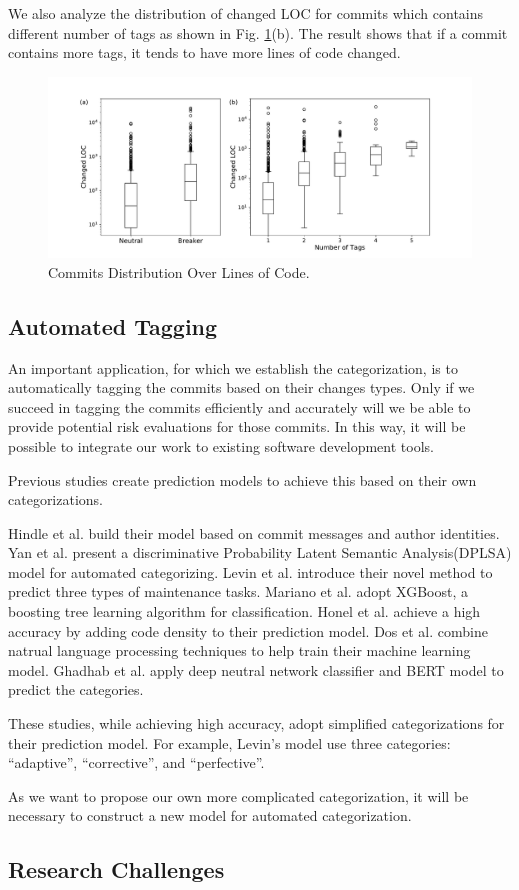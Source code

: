 We also analyze the distribution of changed LOC for commits which contains different number of tags as shown in Fig. \ref{fig: commit_LOC}(b).
The result shows that if a commit contains more tags, it tends to have more lines of code changed. 
\begin{figure}[htbp]
\centerline{\includegraphics[scale=0.5]{figures/commit_size.pdf}}
\caption{Commits Distribution Over Lines of Code.}
\label{fig: commit_LOC}
\end{figure}

\subsection{Automated Tagging}
An important application, for which we establish the categorization, is to automatically tagging the commits based on their changes types.
Only if we succeed in tagging the commits efficiently and accurately will we be able to provide potential risk evaluations for those commits. 
In this way, it will be possible to integrate our work to existing software development tools.

Previous studies create prediction models to achieve this based on their own categorizations.

Hindle et al. \cite{Hindle_auto} build their model based on commit messages and author identities.
Yan et al. \cite{yan2016automatically} present a discriminative Probability Latent Semantic Analysis(DPLSA) model for automated categorizing. 
Levin et al. \cite{levin2017boosting} introduce their novel method to predict three types of maintenance tasks. 
Mariano et al. \cite{mariano2019feature} adopt XGBoost, a boosting tree learning algorithm for classification.
Honel et al. \cite{honel2019importance} achieve a high accuracy by adding code density to their prediction model.
Dos et al. \cite{dos2020commit} combine natrual language processing techniques to help train their machine learning model.
Ghadhab et al. \cite{ghadhab2021augmenting} apply deep neutral network classifier and BERT model to predict the categories.

These studies, while achieving high accuracy, adopt simplified categorizations for their prediction model. 
For example, Levin's model use three categories: ``adaptive'', ``corrective'', and ``perfective''.

As we want to propose our own more complicated categorization, it will be necessary to construct a new model for automated categorization.

\subsection{Research Challenges}

